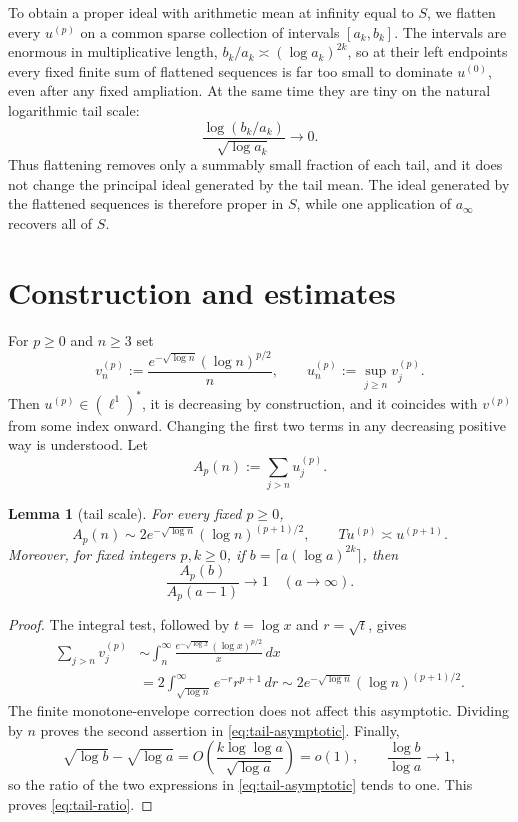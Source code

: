 \documentclass[11pt]{article}
\newtheorem{lemma}{Lemma}
\newcommand{\Tp}{T}
\begin{document}
To obtain a proper ideal with arithmetic mean at infinity equal to $S$, we
flatten every $u^{(p)}$ on a common sparse collection of intervals
$[a_k,b_k]$.  The intervals are enormous in multiplicative length,
$b_k/a_k\asymp(\log a_k)^{2k}$, so at their left endpoints every fixed finite sum
of flattened sequences is far too small to dominate $u^{(0)}$, even after any
fixed ampliation.  At the same time they are tiny on the natural logarithmic
tail scale:
\[
 \frac{\log(b_k/a_k)}{\sqrt{\log a_k}}\longrightarrow0.
\]
Thus flattening removes only a summably small fraction of each tail, and it
does not change the principal ideal generated by the tail mean.  The ideal
generated by the flattened sequences is therefore proper in $S$, while one
application of $a_\infty$ recovers all of $S$.

\section{Construction and estimates}

For $p\ge0$ and $n\ge3$ set
\[
 v^{(p)}_n:=\frac{e^{-\sqrt{\log n}}(\log n)^{p/2}}{n},
 \qquad
 u^{(p)}_n:=\sup_{j\ge n}v^{(p)}_j.
\]
Then $u^{(p)}\in(\ell^1)^*$, it is decreasing by construction, and it
coincides with $v^{(p)}$ from some index onward.  Changing the first two terms
in any decreasing positive way is understood.  Let
\[
 A_p(n):=\sum_{j>n}u^{(p)}_j.
\]

\begin{lemma}[tail scale]\label{lem:tail}
For every fixed $p\ge0$,
\begin{equation}\label{eq:tail-asymptotic}
 A_p(n)\sim
 2e^{-\sqrt{\log n}}(\log n)^{(p+1)/2},
 \qquad
 \Tp u^{(p)}\asymp u^{(p+1)}.
\end{equation}
Moreover, for fixed integers $p,k\ge0$, if
$b=\lceil a(\log a)^{2k}\rceil$, then
\begin{equation}\label{eq:tail-ratio}
                    \frac{A_p(b)}{A_p(a-1)}\longrightarrow1
                    \quad(a\to\infty).
\end{equation}
\end{lemma}

\begin{proof}
The integral test, followed by $t=\log x$ and $r=\sqrt t$, gives
\begin{align*}
 \sum_{j>n}v^{(p)}_j
 &\sim \int_n^\infty
       \frac{e^{-\sqrt{\log x}}(\log x)^{p/2}}{x}\,dx \\
 &=2\int_{\sqrt{\log n}}^\infty e^{-r}r^{p+1}\,dr
 \sim2e^{-\sqrt{\log n}}(\log n)^{(p+1)/2}.
\end{align*}
The finite monotone-envelope correction does not affect this asymptotic.
Dividing by $n$ proves the second assertion in
\eqref{eq:tail-asymptotic}.  Finally,
\[
 \sqrt{\log b}-\sqrt{\log a}
 =O\!\left(\frac{k\log\log a}{\sqrt{\log a}}\right)=o(1),
 \qquad \frac{\log b}{\log a}\to1,
\]
so the ratio of the two expressions in \eqref{eq:tail-asymptotic} tends to
one.  This proves \eqref{eq:tail-ratio}.
\end{proof}
\end{document}
